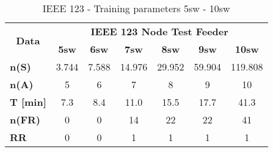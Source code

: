 \begin{table}
    \centering
    \caption{IEEE 123 - Training parameters 5sw - 10sw}
    \label{ch3:tab:td123_1}
    \begin{tabular}{lcccccc} 
    \hline
    \multicolumn{1}{c}{\multirow{2}{*}{ \textbf{Data} }} & \multicolumn{6}{c}{\textbf{IEEE 123 Node Test Feeder} }                                         \\ 
    \cline{2-7}
    \multicolumn{1}{c}{}                                 & \textbf{5sw}  & \textbf{6sw}  & \textbf{7sw}  & \textbf{8sw}  & \textbf{9sw}  & \textbf{10sw}   \\ 
    \hline
     \textbf{n(S)}                                       & 3.744         & 7.588         & 14.976        & 29.952        & 59.904        & 119.808         \\
    \textbf{n(A)}                                        & 5             & 6             & 7             & 8             & 9             & 10              \\
    \textbf{T [min]}                                       & 7.3           & 8.4           & 11.0          & 15.5          & 17.7          & 41.3            \\
    \textbf{n(FR)}                                       & 0             & 0             & 14            & 22            & 22            & 41              \\
    \textbf{RR}                                          & 0             & 0             & 1             & 1             & 1             & 1               \\
    \hline
    \end{tabular}
    \end{table}